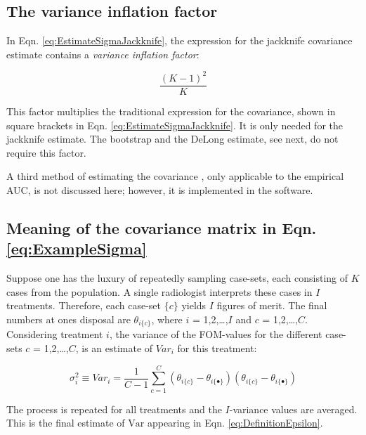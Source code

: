 \documentclass[
]{book}
\begin{document}
\hypertarget{the-variance-inflation-factor}{%
\subsection{The variance inflation factor}\label{the-variance-inflation-factor}}

In Eqn. \eqref{eq:EstimateSigmaJackknife}, the expression for the jackknife covariance estimate contains a \emph{variance inflation factor}:

\begin{equation}
\frac{(K-1)^2}{K}
\label{eq:JKVarianceInflationFactor}
\end{equation}

This factor multiplies the traditional expression for the covariance, shown in square brackets in Eqn. \eqref{eq:EstimateSigmaJackknife}. It is only needed for the jackknife estimate. The bootstrap and the DeLong estimate, see next, do not require this factor.

A third method of estimating the covariance \citep{RN112}, only applicable to the empirical AUC, is not discussed here; however, it is implemented in the software.

\hypertarget{meaning-of-the-covariance-matrix-in-eqn.-refeqexamplesigma}{%
\subsection{Meaning of the covariance matrix in Eqn. \eqref{eq:ExampleSigma}}\label{meaning-of-the-covariance-matrix-in-eqn.-refeqexamplesigma}}

Suppose one has the luxury of repeatedly sampling case-sets, each consisting of \(K\) cases from the population. A single radiologist interprets these cases in \(I\) treatments. Therefore, each case-set \(\{c\}\) yields \(I\) figures of merit. The final numbers at ones disposal are \(\theta_{i\{c\}}\), where \(i\) = 1,2,\ldots,\(I\) and \(c\) = 1,2,\ldots,\(C\). Considering treatment \(i\), the variance of the FOM-values for the different case-sets \(c\) = 1,2,\ldots,\(C\), is an estimate of \(Var_i\) for this treatment:

\begin{equation}
\sigma_i^2 \equiv Var_i = \frac{1}{C-1}\sum_{c=1}^{C}\left ( \theta_{i\{c\}} - \theta_{i\{\bullet\}} \right) \left ( \theta_{i\{c\}} - \theta_{i\{\bullet\}} \right)
\label{eq:EstimateVari}
\end{equation}

The process is repeated for all treatments and the \(I\)-variance values are averaged. This is the final estimate of \(\text{Var}\) appearing in Eqn. \eqref{eq:DefinitionEpsilon}.
\end{document}
